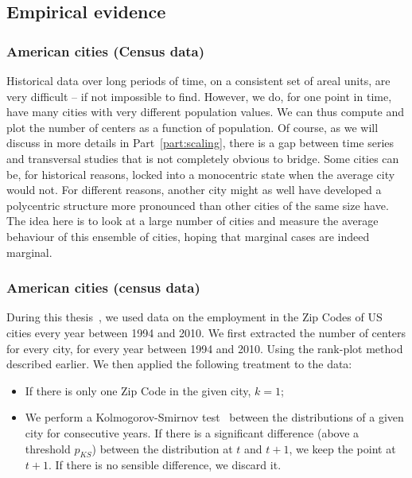 \subsection{Empirical evidence}
\label{sub:empirical_evidence}

\subsubsection{American cities (Census data)}
\label{ssub:american_cities_census_data_}

Historical data over long periods of time, on a consistent set of areal units,
are very difficult -- if not impossible to find. However, we do, for one point in
time, have many cities with very different population values. We can thus compute
and plot the number of centers as a function of population. Of course, as we
will discuss in more details in Part~\ref{part:scaling}, there is a gap between
time series and transversal studies that is not completely obvious to
bridge. Some cities can be, for historical reasons, locked into a monocentric
state when the average city would not. For different reasons, another city
might as well have developed a polycentric structure more pronounced than
other cities of the same size have. The idea here is to look at a large number
of cities and measure the average behaviour of this ensemble of cities, hoping
that marginal cases are indeed marginal.


\subsubsection{American cities (census data)}
\label{ssub:american_cities_census_data_}

During this thesis~\cite{Louf:2013_polycentric}, we used data on the employment in the Zip Codes of US cities
every year between 1994 and 2010. We first extracted the number of
centers for every city, for every year between 1994 and 2010. Using the
rank-plot method described earlier. We then applied the following treatment to
the data:

\begin{itemize}
    \item If there is only one Zip Code in the given city, $k=1$;
    \item We perform a Kolmogorov-Smirnov test~\cite{Massey:1951} between the
        distributions of a given city for consecutive years. If there is a
        significant difference (above a threshold $p_{KS}$) between the
        distribution at $t$ and $t+1$, we keep the point at $t+1$. If there is
        no sensible difference, we discard it.
\end{itemize}


